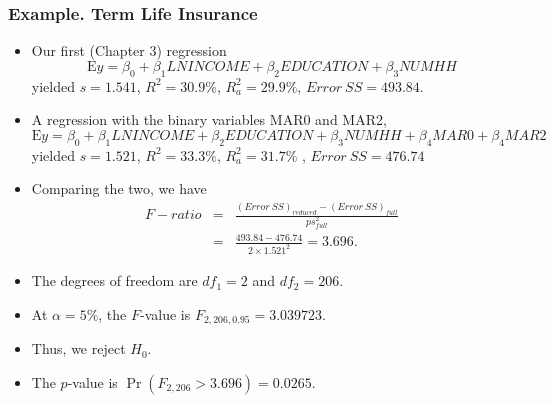 \begin{frame}[shrink=2]
 \frametitle{Example. Term Life Insurance}
   \begin{itemize}
 \item Our first (Chapter 3) regression
   \begin{equation*}
\mathrm{E}y = \beta_0 + \beta_1 LNINCOME +\beta_2 EDUCATION +
\beta_3 NUMHH
\end{equation*}
yielded $s= 1.541$, $R^2 = 30.9\%$, $R_a^2 = 29.9\%$, $Error~SS
=493.84 $.
   \item A regression with the binary variables MAR0 and MAR2,
   \begin{equation*}
\mathrm{E}y = \beta_0 + \beta_1 LNINCOME +\beta_2 EDUCATION +
\beta_3 NUMHH + \beta_4 MAR0 + \beta_4 MAR2
\end{equation*}
yielded $s= 1.521$, $R^2 = 33.3\%$, $R_a^2 = 31.7\%$ , $Error~SS =
476.74$
\item Comparing the two, we have
\begin{eqnarray*}
F-ratio
&=&\frac{(Error~SS)_{reduced}-(Error~SS)_{full}}{ps_{full}^{2}} \\
&=&\frac{493.84 - 476.74 }{2 \times 1.521^2} = 3.696  .
\end{eqnarray*}
\item The degrees of freedom are $df_1 = 2$ and $df_2= 206$.
\item At $\alpha = 5\%$, the $F$-value is $F_{2,206,0.95} =
3.039723$.
\item Thus, we reject $H_0$.
\item The $p$-value is $\Pr( F_{2,206} > 3.696) = 0.0265$.
\end{itemize}
\end{frame}

